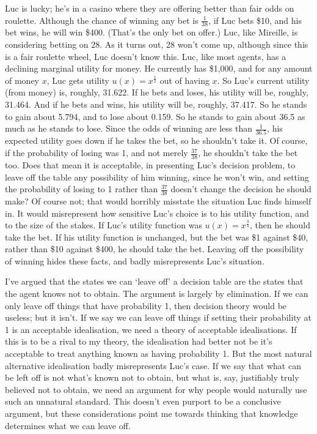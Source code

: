 \documentclass[11pt,]{book}
\begin{document}
Luc is lucky; he's in a casino where they are offering better than fair odds on roulette. Although the chance of winning any bet is \(\frac{1}{38}\), if Luc bets \$10, and his bet wins, he will win \$400. (That's the only bet on offer.) Luc, like Mireille, is considering betting on 28. As it turns out, 28 won't come up, although since this is a fair roulette wheel, Luc doesn't know this. Luc, like most agents, has a declining marginal utility for money. He currently has \$1,000, and for any amount of money \(x\), Luc gets utility \(u(x) = x^{\frac{1}{2}}\) out of having \(x\). So Luc's current utility (from money) is, roughly, 31.622. If he bets and loses, his utility will be, roughly, 31.464. And if he bets and wins, his utility will be, roughly, 37.417. So he stands to gain about 5.794, and to lose about 0.159. So he stands to gain about 36.5 as much as he stands to lose. Since the odds of winning are less than \(\frac{1}{36.5}\), his expected utility goes down if he takes the bet, so he shouldn't take it. Of course, if the probability of losing was 1, and not merely \(\frac{37}{38}\), he shouldn't take the bet too. Does that mean it is acceptable, in presenting Luc's decision problem, to leave off the table any possibility of him winning, since he won't win, and setting the probability of losing to 1 rather than \(\frac{37}{38}\) doesn't change the decision he should make? Of course not; that would horribly misstate the situation Luc finds himself in. It would misrepresent how sensitive Luc's choice is to his utility function, and to the size of the stakes. If Luc's utility function was \(u(x) = x^{\frac{3}{4}}\), then he should take the bet. If his utility function is unchanged, but the bet was \$1 against \$40, rather than \$10 against \$400, he should take the bet. Leaving off the possibility of winning hides these facts, and badly misrepresents Luc's situation.

I've argued that the states we can `leave off' a decision table are the states that the agent knows not to obtain. The argument is largely by elimination. If we can only leave off things that have probability 1, then decision theory would be useless; but it isn't. If we say we can leave off things if setting their probability at 1 is an acceptable idealisation, we need a theory of acceptable idealisations. If this is to be a rival to my theory, the idealisation had better not be it's acceptable to treat anything known as having probability 1. But the most natural alternative idealisation badly misrepresents Luc's case. If we say that what can be left off is not what's known not to obtain, but what is, say, justifiably truly believed not to obtain, we need an argument for why people would naturally use such an unnatural standard. This doesn't even purport to be a conclusive argument, but these considerations point me towards thinking that knowledge determines what we can leave off.
\end{document}
